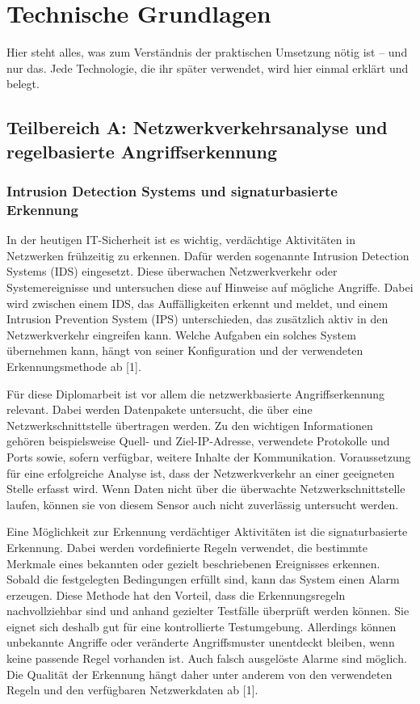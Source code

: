 \chapter{Technische Grundlagen}

Hier steht alles, was zum Verständnis der praktischen Umsetzung nötig ist --
und nur das. Jede Technologie, die ihr später verwendet, wird hier einmal
erklärt und belegt.

\section{Teilbereich A: Netzwerkverkehrsanalyse und regelbasierte Angriffserkennung}

\subsection{Intrusion Detection Systems und signaturbasierte Erkennung}

In der heutigen IT-Sicherheit ist es wichtig, verdächtige Aktivitäten in Netzwerken frühzeitig zu erkennen. Dafür werden sogenannte Intrusion Detection Systems (IDS) eingesetzt. Diese überwachen Netzwerkverkehr oder Systemereignisse und untersuchen diese auf Hinweise auf mögliche Angriffe. Dabei wird zwischen einem IDS, das Auffälligkeiten erkennt und meldet, und einem Intrusion Prevention System (IPS) unterschieden, das zusätzlich aktiv in den Netzwerkverkehr eingreifen kann. Welche Aufgaben ein solches System übernehmen kann, hängt von seiner Konfiguration und der verwendeten Erkennungsmethode ab [1].

Für diese Diplomarbeit ist vor allem die netzwerkbasierte Angriffserkennung relevant. Dabei werden Datenpakete untersucht, die über eine Netzwerkschnittstelle übertragen werden. Zu den wichtigen Informationen gehören beispielsweise Quell- und Ziel-IP-Adresse, verwendete Protokolle und Ports sowie, sofern verfügbar, weitere Inhalte der Kommunikation. Voraussetzung für eine erfolgreiche Analyse ist, dass der Netzwerkverkehr an einer geeigneten Stelle erfasst wird. Wenn Daten nicht über die überwachte Netzwerkschnittstelle laufen, können sie von diesem Sensor auch nicht zuverlässig untersucht werden.

Eine Möglichkeit zur Erkennung verdächtiger Aktivitäten ist die signaturbasierte Erkennung. Dabei werden vordefinierte Regeln verwendet, die bestimmte Merkmale eines bekannten oder gezielt beschriebenen Ereignisses erkennen. Sobald die festgelegten Bedingungen erfüllt sind, kann das System einen Alarm erzeugen. Diese Methode hat den Vorteil, dass die Erkennungsregeln nachvollziehbar sind und anhand gezielter Testfälle überprüft werden können. Sie eignet sich deshalb gut für eine kontrollierte Testumgebung. Allerdings können unbekannte Angriffe oder veränderte Angriffsmuster unentdeckt bleiben, wenn keine passende Regel vorhanden ist. Auch falsch ausgelöste Alarme sind möglich. Die Qualität der Erkennung hängt daher unter anderem von den verwendeten Regeln und den verfügbaren Netzwerkdaten ab [1].

